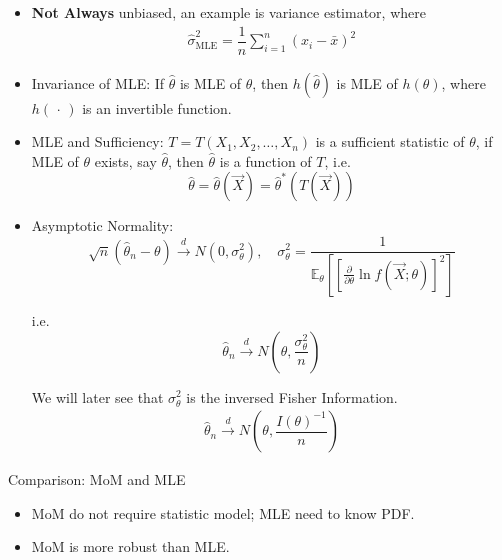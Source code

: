         
    \begin{itemize}
        \item \textbf{Not Always} unbiased, an example is variance estimator, where
        \begin{align}
            \hat{\sigma }^2_\mathrm{MLE}=\dfrac{1}{n}\sum_{i=1}^n(x_i-\bar{x})^2  
        \end{align}
        
         
        \item Invariance of MLE: If $\hat{\theta}$ is MLE of $\theta$,  then $h(\hat{\theta})$ is MLE of $h(\theta)$, where $ h(\, \cdot \, ) $ is an invertible function.
        \item MLE and Sufficiency: $T=T(X_1,X_2,\ldots,X_n)$ is a sufficient statistic of $\theta$, if MLE of $\theta$ exists, say $\hat{\theta}$, then $\hat{\theta}$ is a function of $T$, i.e.
        \begin{equation}  
            \hat{\theta}=\hat{\theta}(\vec{X})=\hat{\theta}^*(T(\vec{X}))    
        \end{equation}
        \item Asymptotic Normality: 
        \begin{equation}
            \sqrt{n}(\hat{\theta}_n-\theta) \xrightarrow[]{d}N(0,\sigma^2_\theta),\quad \sigma^2_\theta=\frac{1}{\mathbb{E}_\theta\left[[\frac{\partial}{\partial\theta}\ln f(\vec{X};\theta)]^2\right]}   
        \end{equation}

        i.e.
        \begin{equation}
            \hat{\theta}_n\xrightarrow[]{d}N(\theta,\frac{\sigma^2_\theta}{n})    
        \end{equation}
        
        We will later see that $ \sigma _\theta ^2 $ is the inversed Fisher Information.
        \begin{align}\label{EqaAsymptoticDistributionMLE}
            \hat{\theta }_n\xrightarrow[]{d} N(\theta ,\dfrac{I(\theta )^{-1}}{n})
        \end{align}
        
        
    \end{itemize}

    \begin{point}
        Comparison: MoM and MLE
    \end{point}
    
        
    \begin{itemize}
        \item MoM do not require statistic model; MLE need to know PDF.
        \item MoM is more robust than MLE.
    \end{itemize}


